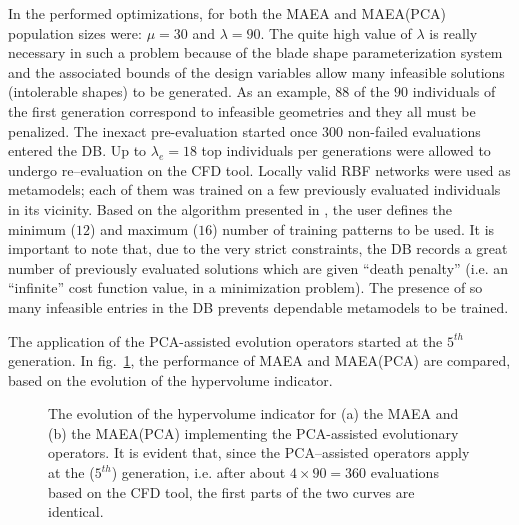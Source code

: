 In the performed optimizations, for both the MAEA and MAEA(PCA) population sizes were: $\mu\!=\!30$ and $\lambda\!=\!90$. The quite high value of $\lambda$ is really necessary in such a problem because of the blade shape parameterization system and the associated bounds of the design variables allow many infeasible solutions  (intolerable shapes) to be generated. As an example, $88$ of the $90$ individuals of the first generation correspond to infeasible geometries and they all must be penalized. The inexact pre-evaluation started once $300$ non-failed evaluations entered the DB. Up to $\lambda_e\!=\!18$ top individuals per generations were allowed to undergo re--evaluation on the CFD tool. Locally valid RBF networks were used as metamodels; each of them was trained on a few previously evaluated individuals in its vicinity. Based on the algorithm presented in \cite{LTT_2_029}, the user defines the minimum ($12$) and maximum ($16$) number of training patterns to be used. It is important to note that, due to the very strict constraints, the DB records a great number of previously evaluated solutions which are given ``death penalty'' (i.e. an ``infinite'' cost function value, in a minimization problem). The presence of so many infeasible entries in the DB prevents dependable metamodels to be trained.

The application of the PCA-assisted evolution operators started at the $5^{th}$ generation. In fig.~\ref{hyp_matrix}, the performance of MAEA and MAEA(PCA) are compared, based on the evolution of the hypervolume indicator.


\begin{figure}[h!]
\begin{minipage}[b]{1\linewidth}
 \centering
\end{minipage}
\caption{The evolution of the hypervolume indicator for (a) the MAEA and (b) the MAEA(PCA) implementing the PCA-assisted evolutionary operators. It is evident that, since the PCA--assisted operators apply at the ($5^{th}$) generation, i.e. after about $4\!\times\!90\!=\!360$ evaluations based on the CFD tool, the first parts of the two curves are identical.}
\label{hyp_matrix}
\end{figure}
 
